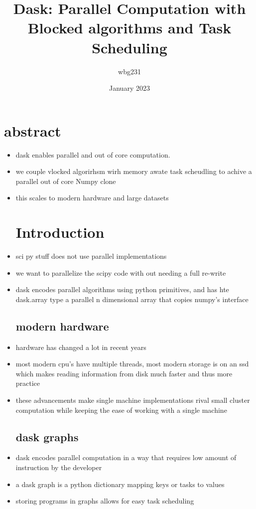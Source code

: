 \documentclass{article}
\title{Dask: Parallel Computation with Blocked algorithms
and Task Scheduling}
\author{wbg231 }
\date{January 2023}
\begin{document}
\maketitle

\section{abstract }
\begin{itemize}
\item dask enables parallel and out of core computation. 
\item we couple vlocked algorirhsm wirh memory awate task scheudling to achive a parallel out of core Numpy clone 
\item this scales to modern hardware and large datasets 
\section*{Introduction}
\item sci py stuff does not use parallel implementations 
\item we want to parallelize the scipy code with out needing a full re-write
\item dask encodes parallel algorithms using python primitives, and has hte dask.array type a parallel n dimensional array that copies numpy's interface
\subsection*{modern hardware}
\item hardware has changed a lot in recent years 
\item most modern cpu's have multiple threads, most modern storage is on an ssd which makes reading information from disk much faster and thus more practice
\item these advancements make single machine implementations rival small cluster computation while keeping the ease of working with a single machine 
\subsection*{dask graphs}
\item dask encodes parallel computation in a way that requires low amount of instruction by the developer
\item a dask graph is a python dictionary mapping keys or tasks to values 
\item storing programs in graphs allows for easy task scheduling 

\end{itemize}
\end{document}
